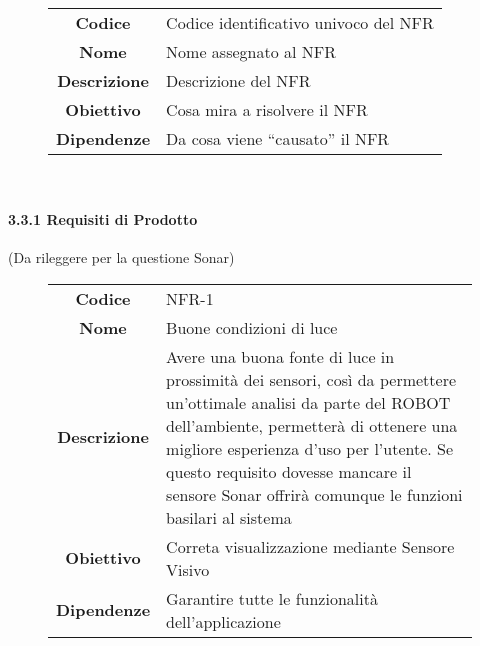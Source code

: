\documentclass[]{article}
\let\oldparagraph\paragraph
\renewcommand{\paragraph}[1]{\oldparagraph{#1}\mbox{}}
\begin{document}
~

\begin{figure}[htbp]
\centering
\begin{tabular}{|c|l|}
\hline
\textbf{Codice} & Codice identificativo univoco del NFR\\
\textbf{Nome} & Nome assegnato al NFR\\
\textbf{Descrizione} & Descrizione del NFR\\
\textbf{Obiettivo} & Cosa mira a risolvere il NFR\\
\textbf{Dipendenze} & Da cosa viene ``causato'' il NFR\\
\hline
\end{tabular}
\end{figure}

~

\hypertarget{requisiti-di-prodotto}{%
\paragraph{3.3.1 Requisiti di Prodotto}\label{requisiti-di-prodotto}}

(Da rileggere per la questione Sonar)

\begin{figure}[htbp]
\centering
\begin{tabular}{|c|l|}
\hline

\textbf{Codice}
 & 
NFR-1
\\

\textbf{Nome}
 & 
Buone condizioni di luce
\\

\textbf{Descrizione}
 & 
Avere una buona fonte di luce in prossimità dei sensori, così da
permettere un'ottimale analisi da parte del ROBOT dell'ambiente,
permetterà di ottenere una migliore esperienza d'uso per l'utente. Se
questo requisito dovesse mancare il sensore Sonar offrirà comunque le
funzioni basilari al sistema
\\

\textbf{Obiettivo}
 & 
Correta visualizzazione mediante Sensore Visivo
\\

\textbf{Dipendenze}
 & 
Garantire tutte le funzionalità dell'applicazione
\\
\hline
\end{tabular}
\end{figure}

~
\end{document}

